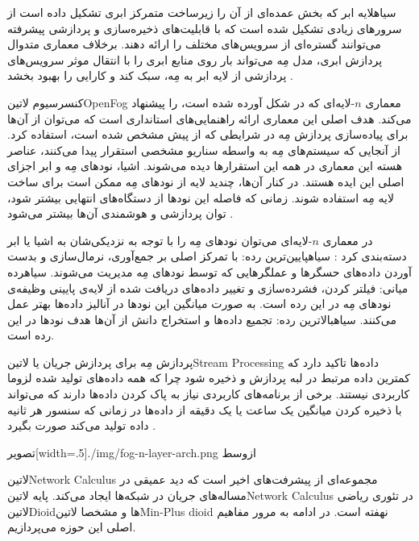 ‌سیاه{لایه ابر} که بخش عمده‌ای از آن را زیرساخت متمرکز ابری تشکیل داده است از سرورهای زیادی تشکیل شده است که با قابلیت‌های ذخیره‌سازی و پردازشی
پیشرفته می‌توانند گستره‌ای از سرویس‌های مختلف را ارائه دهند. برخلاف معماری متدوال پردازش ابری، مدل مِه می‌تواند بار روی منابع ابری را با انتقال موثر سرویس‌های پردازشی
از لایه ابر به مِه، سبک کند و کارایی را بهبود بخشد
.

کنسرسیوم ‌لاتین{OpenFog} معماری $n$-لایه‌ای که در شکل  آورده شده است، را پیشنهاد می‌کند.
هدف اصلی این معماری ارائه راهنمایی‌های استانداری است که می‌توان از آن‌ها برای پیاده‌سازی پردازش مِه در شرایطی که از پیش مشخص شده است، استفاده کرد.
از آنجایی که سیستم‌های مِه به واسطه سناریو مشخصی استقرار پیدا می‌کنند، عناصر هسته این معماری در همه این استقرارها دیده می‌شوند.
اشیا، نودهای مِه و ابر اجزای اصلی این ایده هستند. در کنار آن‌ها، چندید لایه از نودهای مِه ممکن است برای ساخت لایه مِه استفاده شوند.
زمانی که فاصله این نودها از دستگاه‌های انتهایی بیشتر شود، توان پردازشی و هوشمندی آن‌ها بیشتر می‌شود
.

در معماری $n$-لایه‌ای می‌توان نودهای مِه را با توجه به نزدیکی‌شان به اشیا یا ابر دسته‌بندی کرد
:
 ‌سیاه{پایین‌ترین رده}: با تمرکز اصلی بر جمع‌آوری، نرمال‌سازی و بدست آوردن داده‌های حسگرها و عملگرهایی که توسط نودهای مِه مدیریت می‌شوند.
 ‌سیاه{رده میانی}: فیلتر کردن، فشرده‌سازی و تغییر داده‌های دریافت شده از لایه‌ی پایینی وظیفه‌ی نودهای مِه در این رده است. به صورت میانگین
این نودها در آنالیز داده‌ها بهتر عمل می‌کنند.
 ‌سیاه{بالاترین رده}: تجمیع داده‌ها و استخراج دانش از آن‌ها هدف نودها در این رده است.

پردازش مِه برای پردازش جریان یا ‌لاتین{Stream Processing} داده‌ها تاکید دارد که کمترین داده مرتبط در لبه پردازش و ذخیره شود
چرا که همه داده‌های تولید شده لزوما کاربردی نیستند.
برخی از برنامه‌های کاربردی نیاز به پاک کردن داده‌ها دارند که می‌تواند با ذخیره کردن میانگین یک ساعت یا یک دقیقه از داده‌ها در زمانی که سنسور
هر ثانیه داده تولید می‌کند صورت بگیرد
.

‌تصویر[width=.5\textwidth]{./img/fog-n-layer-arch.png}
‌ازوسط


‌لاتین{Network Calculus} مجموعه‌ای از پیشرفت‌های اخیر است که دید عمیقی در مساله‌های جریان در شبکه‌ها ایجاد می‌کند. پایه ‌لاتین{Network Calculus} در تئوری ریاضی ‌لاتین{Dioid}ها و مشخصا ‌لاتین{Min-Plus dioid} نهفته است.
در ادامه به مرور مفاهیم اصلی این حوزه می‌پردازیم.

